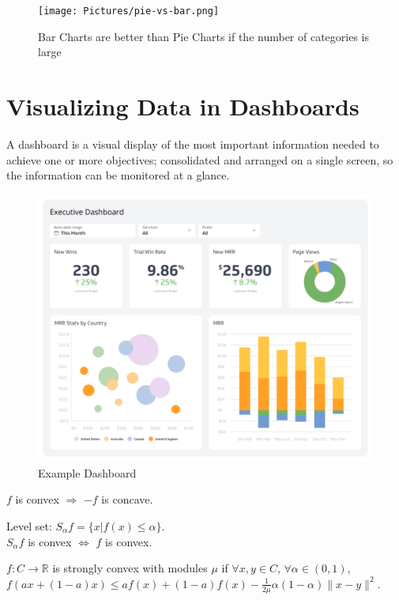 \documentclass[11pt,fleqn]{book} %
\def\R{\mathbb{R}}
\begin{document}
\begin{example}
\begin{figure}[hibt!]
  \centering
  \texttt{[image: Pictures/pie-vs-bar.png]}
  \caption{Bar Charts are better than Pie Charts if
  the number of categories is large}
  \label{fig:pie-vs-bar}
\end{figure}

\section{Visualizing Data in Dashboards}

\begin{definition}[Dashboard]
  A dashboard is a visual display of the most important information
  needed to achieve one or more objectives;
  consolidated and arranged on a single screen, so the information
  can be monitored at a glance.
\end{definition}

\begin{figure}[htb!]
  \centering
  \includegraphics[width=0.8\linewidth]{Pictures/dashboard.png}
  \caption{Example Dashboard}
  \label{fig:dashboard}
\end{figure}


\newpage

\begin{remark}
$f$ is convex $\Rightarrow$ $-f$ is concave.
\end{remark}
Level set: $S_{\alpha}f = \{ x | f(x) \le \alpha \}$.\\
$S_{\alpha}f$ is convex $\Leftrightarrow$ $f$ is convex. \\
\begin{definition}
$f : C \rightarrow \R$ is strongly convex with modules $\mu$ if $\forall x, y \in C$, $\forall \alpha \in (0,1)$, $f(ax + (1-a)x) \le af(x) + (1-a)f(x) - \frac{1}{2\mu}\alpha(1- \alpha) \|x-y\|^2$.
\end{definition}


\end{example}
\end{document}
